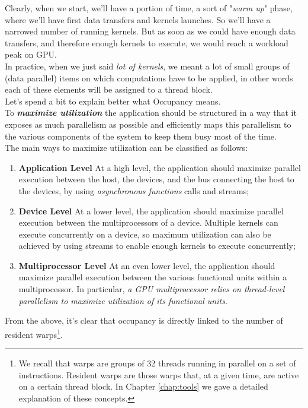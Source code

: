 	Clearly, when we start, we'll have a portion of time, a sort of "\textit{warm up}" phase, where we'll have first data transfers and kernels launches. So we'll have a narrowed number of running kernels. 
	But as soon as we could have enough data transfers, and therefore enough kernels to execute, we would reach a workload peak on GPU.\\
	In practice, when we just said \textit{lot of kernels}, we meant a lot of small groups of (data parallel) items on which computations have to be applied, in other words each of these elements will be assigned to a thread block.\\ Let's spend a bit to explain better what Occupancy means.\\

	To \textit{\textbf{maximize utilization}} the application should be structured in a way that it exposes as much parallelism as possible and efficiently maps this parallelism to the various components of the system to keep them busy most of the time.\\
	The main ways to maximize utilization can be classified as follows:
	\begin{enumerate}
			\item \textbf{Application Level}
			At a high level, the application should maximize parallel execution between the host, the
			devices, and the bus connecting the host to the devices, by using \textit{asynchronous functions} calls and streams;
			
			
			\item \textbf{Device Level}
			At a lower level, the application should maximize parallel execution between the multiprocessors of a device.
			Multiple kernels can execute concurrently on a device, so maximum utilization can also be achieved by using streams to enable enough kernels to execute concurrently;
			
			
			\item \textbf{Multiprocessor Level}
			At an even lower level, the application should maximize parallel execution between the	various functional units within a multiprocessor.
			In particular, \textit{a GPU multiprocessor relies on thread-level parallelism to maximize utilization of its functional units}. 
	\end{enumerate}
	
	From the above, it's clear that occupancy is directly linked to the number of resident warps\footnote{We recall that warps are groups of 32 threads running in parallel on a set of instructions. Resident warps are those warps that, at a given time, are active on a certain thread block. In Chapter \ref{chap:tools} we gave a detailed explanation of these concepts.}.

